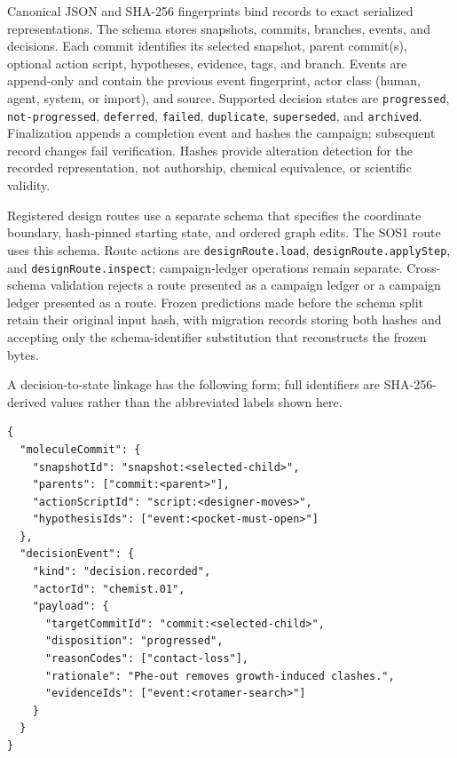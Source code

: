 \documentclass[11pt]{article}
\begin{document}
\begin{small}
Canonical JSON and SHA-256 fingerprints bind records to exact serialized representations. The  schema stores snapshots, commits, branches, events, and decisions. Each commit identifies its selected snapshot, parent commit(s), optional action script, hypotheses, evidence, tags, and branch. Events are append-only and contain the previous event fingerprint, actor class (human, agent, system, or import), and source. Supported decision states are \texttt{progressed}, \texttt{not-progressed}, \texttt{deferred}, \texttt{failed}, \texttt{duplicate}, \texttt{superseded}, and \texttt{archived}. Finalization appends a completion event and hashes the campaign; subsequent record changes fail verification. Hashes provide alteration detection for the recorded representation, not authorship, chemical equivalence, or scientific validity.

Registered design routes use a separate  schema that specifies the coordinate boundary, hash-pinned starting state, and ordered graph edits. The SOS1 route uses this schema. Route actions are \texttt{designRoute.load}, \texttt{designRoute.applyStep}, and \texttt{designRoute.inspect}; campaign-ledger operations remain separate. Cross-schema validation rejects a route presented as a campaign ledger or a campaign ledger presented as a route. Frozen predictions made before the schema split retain their original input hash, with migration records storing both hashes and accepting only the schema-identifier substitution that reconstructs the frozen bytes.

A decision-to-state linkage has the following form; full identifiers are SHA-256-derived values rather than the abbreviated labels shown here.

\begin{lstlisting}
{
  "moleculeCommit": {
    "snapshotId": "snapshot:<selected-child>",
    "parents": ["commit:<parent>"],
    "actionScriptId": "script:<designer-moves>",
    "hypothesisIds": ["event:<pocket-must-open>"]
  },
  "decisionEvent": {
    "kind": "decision.recorded",
    "actorId": "chemist.01",
    "payload": {
      "targetCommitId": "commit:<selected-child>",
      "disposition": "progressed",
      "reasonCodes": ["contact-loss"],
      "rationale": "Phe-out removes growth-induced clashes.",
      "evidenceIds": ["event:<rotamer-search>"]
    }
  }
}
\end{lstlisting}


\end{small}
\end{document}
